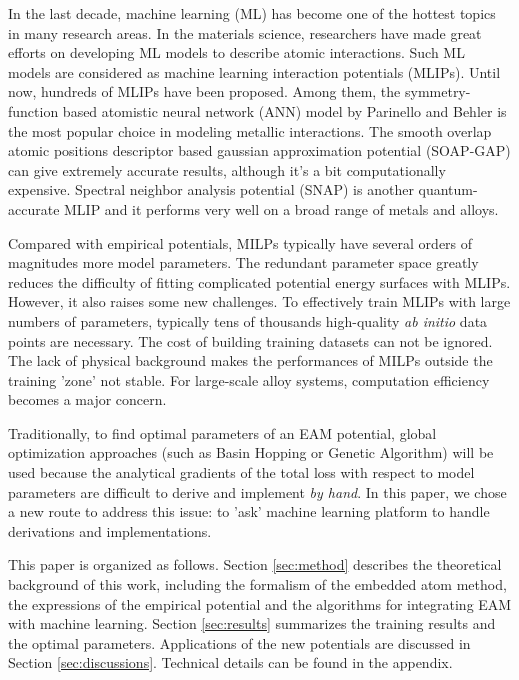 \documentclass[prb,reprint]{revtex4-2}
\begin{document}
In the last decade, machine learning (ML) has become one of the hottest 
topics in many research areas. In the materials science, researchers have made 
great efforts on developing ML models to describe atomic interactions. Such ML 
models are considered as machine learning interaction potentials (MLIPs). Until 
now, hundreds of MLIPs have been proposed. Among them, the symmetry-function 
based atomistic neural network (ANN) model by Parinello and Behler is the most 
popular choice in modeling metallic interactions. The smooth overlap atomic 
positions descriptor based gaussian approximation potential (SOAP-GAP) can give
extremely accurate results, although it's a bit computationally expensive. 
Spectral neighbor analysis potential (SNAP) is another quantum-accurate MLIP and
it performs very well on a broad range of metals and alloys. 

Compared with empirical potentials, MILPs typically have several orders of 
magnitudes more model parameters. The redundant parameter space greatly reduces 
the difficulty of fitting complicated potential energy surfaces with MLIPs. 
However, it also raises some new challenges. To effectively train MLIPs with 
large numbers of parameters, typically tens of thousands high-quality 
\textit{ab initio} data points are necessary. The cost of building training 
datasets can not be ignored. The lack of physical background makes the 
performances of MILPs outside the training 'zone' not stable. For large-scale 
alloy systems, computation efficiency becomes a major concern.  

Traditionally, to find optimal parameters of an EAM potential, global 
optimization approaches (such as Basin Hopping or Genetic Algorithm) will be 
used because the analytical gradients of the total loss with respect to model
parameters are difficult to derive and implement \textit{by hand}. In this 
paper, we chose a new route to address this issue: to 'ask' machine learning 
platform to handle derivations and implementations. 

This paper is organized as follows. Section \ref{sec:method} describes the 
theoretical background of this work, including the formalism of the embedded 
atom method, the expressions of the empirical potential and the algorithms for 
integrating EAM with machine learning. Section \ref{sec:results} summarizes the 
training results and the optimal parameters. Applications of the new potentials 
are discussed in Section \ref{sec:discussions}. Technical details can be found 
in the appendix.
\end{document}
